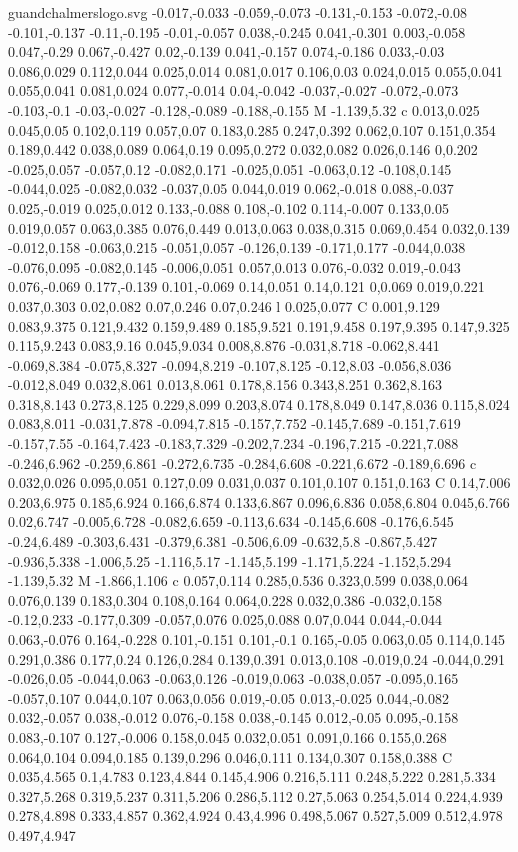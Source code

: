 \begin{filecontents}[noheader]{guandchalmerslogo.svg}
-0.017,-0.033 -0.059,-0.073 -0.131,-0.153 -0.072,-0.08 -0.101,-0.137 -0.11,-0.195 -0.01,-0.057 0.038,-0.245 0.041,-0.301 0.003,-0.058 0.047,-0.29 0.067,-0.427 0.02,-0.139 0.041,-0.157 0.074,-0.186 0.033,-0.03 0.086,0.029 0.112,0.044 0.025,0.014 0.081,0.017 0.106,0.03 0.024,0.015 0.055,0.041 0.055,0.041 0.081,0.024 0.077,-0.014 0.04,-0.042 -0.037,-0.027 -0.072,-0.073 -0.103,-0.1 -0.03,-0.027 -0.128,-0.089 -0.188,-0.155 M -1.139,5.32 c 0.013,0.025 0.045,0.05 0.102,0.119 0.057,0.07 0.183,0.285 0.247,0.392 0.062,0.107 0.151,0.354 0.189,0.442 0.038,0.089 0.064,0.19 0.095,0.272 0.032,0.082 0.026,0.146 0,0.202 -0.025,0.057 -0.057,0.12 -0.082,0.171 -0.025,0.051 -0.063,0.12 -0.108,0.145 -0.044,0.025 -0.082,0.032 -0.037,0.05 0.044,0.019 0.062,-0.018 0.088,-0.037 0.025,-0.019 0.025,0.012 0.133,-0.088 0.108,-0.102 0.114,-0.007 0.133,0.05 0.019,0.057 0.063,0.385 0.076,0.449 0.013,0.063 0.038,0.315 0.069,0.454 0.032,0.139 -0.012,0.158 -0.063,0.215 -0.051,0.057 -0.126,0.139 -0.171,0.177 -0.044,0.038 -0.076,0.095 -0.082,0.145 -0.006,0.051 0.057,0.013 0.076,-0.032 0.019,-0.043 0.076,-0.069 0.177,-0.139 0.101,-0.069 0.14,0.051 0.14,0.121 0,0.069 0.019,0.221 0.037,0.303 0.02,0.082 0.07,0.246 0.07,0.246 l 0.025,0.077 C 0.001,9.129 0.083,9.375 0.121,9.432 0.159,9.489 0.185,9.521 0.191,9.458 0.197,9.395 0.147,9.325 0.115,9.243 0.083,9.16 0.045,9.034 0.008,8.876 -0.031,8.718 -0.062,8.441 -0.069,8.384 -0.075,8.327 -0.094,8.219 -0.107,8.125 -0.12,8.03 -0.056,8.036 -0.012,8.049 0.032,8.061 0.013,8.061 0.178,8.156 0.343,8.251 0.362,8.163 0.318,8.143 0.273,8.125 0.229,8.099 0.203,8.074 0.178,8.049 0.147,8.036 0.115,8.024 0.083,8.011 -0.031,7.878 -0.094,7.815 -0.157,7.752 -0.145,7.689 -0.151,7.619 -0.157,7.55 -0.164,7.423 -0.183,7.329 -0.202,7.234 -0.196,7.215 -0.221,7.088 -0.246,6.962 -0.259,6.861 -0.272,6.735 -0.284,6.608 -0.221,6.672 -0.189,6.696 c 0.032,0.026 0.095,0.051 0.127,0.09 0.031,0.037 0.101,0.107 0.151,0.163 C 0.14,7.006 0.203,6.975 0.185,6.924 0.166,6.874 0.133,6.867 0.096,6.836 0.058,6.804 0.045,6.766 0.02,6.747 -0.005,6.728 -0.082,6.659 -0.113,6.634 -0.145,6.608 -0.176,6.545 -0.24,6.489 -0.303,6.431 -0.379,6.381 -0.506,6.09 -0.632,5.8 -0.867,5.427 -0.936,5.338 -1.006,5.25 -1.116,5.17 -1.145,5.199 -1.171,5.224 -1.152,5.294 -1.139,5.32 M -1.866,1.106 c 0.057,0.114 0.285,0.536 0.323,0.599 0.038,0.064 0.076,0.139 0.183,0.304 0.108,0.164 0.064,0.228 0.032,0.386 -0.032,0.158 -0.12,0.233 -0.177,0.309 -0.057,0.076 0.025,0.088 0.07,0.044 0.044,-0.044 0.063,-0.076 0.164,-0.228 0.101,-0.151 0.101,-0.1 0.165,-0.05 0.063,0.05 0.114,0.145 0.291,0.386 0.177,0.24 0.126,0.284 0.139,0.391 0.013,0.108 -0.019,0.24 -0.044,0.291 -0.026,0.05 -0.044,0.063 -0.063,0.126 -0.019,0.063 -0.038,0.057 -0.095,0.165 -0.057,0.107 0.044,0.107 0.063,0.056 0.019,-0.05 0.013,-0.025 0.044,-0.082 0.032,-0.057 0.038,-0.012 0.076,-0.158 0.038,-0.145 0.012,-0.05 0.095,-0.158 0.083,-0.107 0.127,-0.006 0.158,0.045 0.032,0.051 0.091,0.166 0.155,0.268 0.064,0.104 0.094,0.185 0.139,0.296 0.046,0.111 0.134,0.307 0.158,0.388 C 0.035,4.565 0.1,4.783 0.123,4.844 0.145,4.906 0.216,5.111 0.248,5.222 0.281,5.334 0.327,5.268 0.319,5.237 0.311,5.206 0.286,5.112 0.27,5.063 0.254,5.014 0.224,4.939 0.278,4.898 0.333,4.857 0.362,4.924 0.43,4.996 0.498,5.067 0.527,5.009 0.512,4.978 0.497,4.947 
\end{filecontents}
